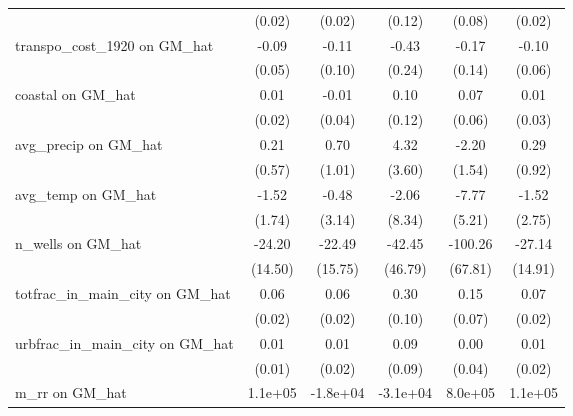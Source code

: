 \begin{table}[htbp]
\begin{tabular}{l*{5}{c}}
                &   (0.02)         &   (0.02)         &   (0.12)         &   (0.08)         &   (0.02)         \\
\addlinespace
transpo\_cost\_1920 on GM\_hat&    -0.09         &    -0.11         &    -0.43         &    -0.17         &    -0.10         \\
                &   (0.05)         &   (0.10)         &   (0.24)         &   (0.14)         &   (0.06)         \\
\addlinespace
coastal on GM\_hat&     0.01         &    -0.01         &     0.10         &     0.07         &     0.01         \\
                &   (0.02)         &   (0.04)         &   (0.12)         &   (0.06)         &   (0.03)         \\
\addlinespace
avg\_precip on GM\_hat&     0.21         &     0.70         &     4.32         &    -2.20         &     0.29         \\
                &   (0.57)         &   (1.01)         &   (3.60)         &   (1.54)         &   (0.92)         \\
\addlinespace
avg\_temp on GM\_hat&    -1.52         &    -0.48         &    -2.06         &    -7.77         &    -1.52         \\
                &   (1.74)         &   (3.14)         &   (8.34)         &   (5.21)         &   (2.75)         \\
\addlinespace
n\_wells on GM\_hat&   -24.20         &   -22.49         &   -42.45         &  -100.26         &   -27.14         \\
                &  (14.50)         &  (15.75)         &  (46.79)         &  (67.81)         &  (14.91)         \\
\addlinespace
totfrac\_in\_main\_city on GM\_hat&     0.06\sym{**} &     0.06\sym{**} &     0.30\sym{**} &     0.15\sym{*}  &     0.07\sym{***}\\
                &   (0.02)         &   (0.02)         &   (0.10)         &   (0.07)         &   (0.02)         \\
\addlinespace
urbfrac\_in\_main\_city on GM\_hat&     0.01         &     0.01         &     0.09         &     0.00         &     0.01         \\
                &   (0.01)         &   (0.02)         &   (0.09)         &   (0.04)         &   (0.02)         \\
\addlinespace
m\_rr on GM\_hat  &  1.1e+05         & -1.8e+04         & -3.1e+04         &  8.0e+05\sym{**} &  1.1e+05         \\

\end{tabular}
\end{table}
